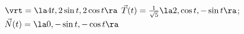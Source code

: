{$\vrt = \la 4t,2\sin t,2\cos t \ra$
}
{$\vec T(t) = \frac{1}{\sqrt{5}}\la 2,\cos t,-\sin t\ra$; $\vec N(t) = \la 0,-\sin t,-\cos t\ra$
}